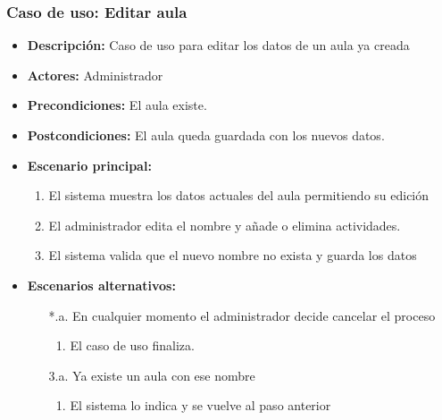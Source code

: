 \documentclass{book}
\begin{document}
\subsubsection*{Caso de uso: Editar aula}
\begin{itemize}
\item{\bf Descripción:} Caso de uso para editar los datos de un aula ya creada
\item{\bf Actores:} Administrador
\item{\bf Precondiciones:} El aula existe.
\item{\bf Postcondiciones:} El aula queda guardada con los nuevos datos.
\item{\bf Escenario principal:}
	\begin{enumerate}
	\item El sistema muestra los datos actuales del aula permitiendo su edición
	\item El administrador edita el nombre y añade o elimina actividades.
	\item El sistema valida que el nuevo nombre no exista y guarda los datos
	\end{enumerate}
\item{\bf Escenarios alternativos:}
	\begin{itemize}
		\item[*.a.] En cualquier momento el administrador decide cancelar el proceso
		\begin{enumerate}
			\item El caso de uso finaliza.
		\end{enumerate}
		\item[3.a.] Ya existe un aula con ese nombre
		\begin{enumerate}
			\item El sistema lo indica y se vuelve al paso anterior
		\end{enumerate}
	\end{itemize}
\end{itemize}
\end{document}
